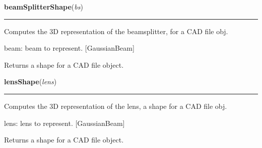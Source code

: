     \label{theia:rendering:shapes:beamSplitterShape}

    \vspace{0.5ex}

\hspace{.8\funcindent}\begin{boxedminipage}{\funcwidth}

    \raggedright \textbf{beamSplitterShape}(\textit{bs})

    \vspace{-1.5ex}

    \rule{\textwidth}{0.5\fboxrule}
\setlength{\parskip}{2ex}
    Computes the 3D representation of the beamsplitter, for a CAD file obj.

    beam: beam to represent. [GaussianBeam]

    Returns a shape for a CAD file object.

\setlength{\parskip}{1ex}
    \end{boxedminipage}

    \label{theia:rendering:shapes:lensShape}

    \vspace{0.5ex}

\hspace{.8\funcindent}\begin{boxedminipage}{\funcwidth}

    \raggedright \textbf{lensShape}(\textit{lens})

    \vspace{-1.5ex}

    \rule{\textwidth}{0.5\fboxrule}
\setlength{\parskip}{2ex}
    Computes the 3D representation of the lens, a shape for a CAD file obj.

    lens: lens to represent. [GaussianBeam]

    Returns a shape for a CAD file object.

\setlength{\parskip}{1ex}
    \end{boxedminipage}

    \label{theia:rendering:shapes:beamDumpShape}

